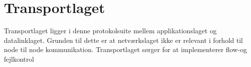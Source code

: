 \section{Transportlaget}
Transportlaget ligger i denne protokolsuite mellem applikationslaget og datalinklaget. Grunden til dette er at netværkslaget ikke er relevant i forhold til node til node kommunikation. Transportlaget sørger for at implementerer flow-og fejlkontrol
